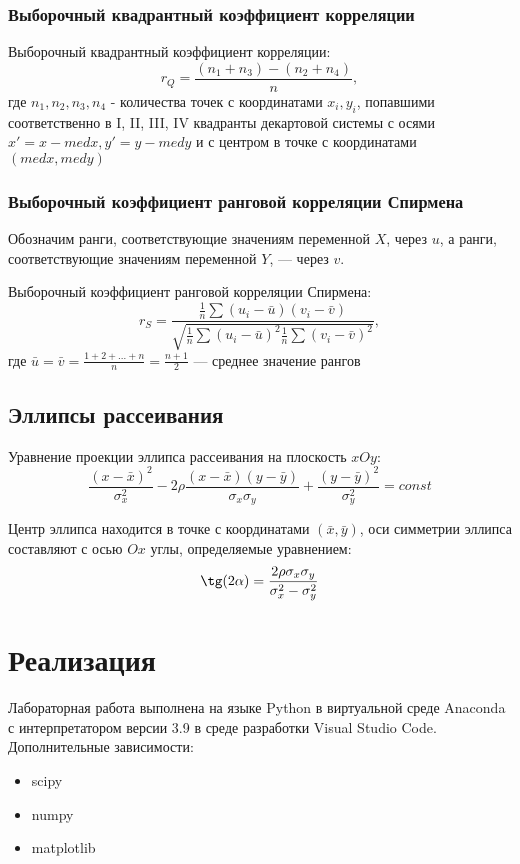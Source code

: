 \documentclass[12pt,a4paper]{article}
\begin{document}
\subsubsection{Выборочный квадрантный коэффициент корреляции}
Выборочный квадрантный коэффициент корреляции:
\begin{equation}
    r_Q=\frac{(n_1+n_3)-(n_2+n_4)}{n},
\end{equation}
где $n_1,n_2,n_3,n_4$ - количества точек с координатами $x_i,y_i$, попавшими соответственно в I, II, III, IV квадранты декартовой системы с осями $x'=x-medx,y'=y-medy$ и с центром в точке с координатами $(medx,medy)$

\subsubsection{Выборочный коэффициент ранговой корреляции Спирмена}
Обозначим ранги, соответствующие значениям переменной $X$, через $u$, а ранги, соответствующие значениям переменной $Y$, — через $v$.

Выборочный коэффициент ранговой корреляции Спирмена:
\begin{equation}
    r_S=\frac{\frac{1}{n}\sum{(u_i-\bar{u})(v_i-\bar{v})}}{\sqrt{\frac{1}{n}\sum{(u_i-\bar{u})^2}\frac{1}{n}\sum{(v_i-\bar{v})^2}}},
\end{equation}
где $\bar{u}=\bar{v}=\frac{1+2+...+n}{n}=\frac{n+1}{2}$ — среднее значение рангов

\subsection{Эллипсы рассеивания}
Уравнение проекции эллипса рассеивания на плоскость $xOy$:
\begin{equation}
    \frac{(x-\bar{x})^2}{\sigma_x^2}-2\rho\frac{(x-\bar{x})(y-\bar{y})}{\sigma_x\sigma_y}+\frac{(y-\bar{y})^2}{\sigma_y^2}=const
\end{equation}

Центр эллипса находится в точке с координатами $(\bar{x},\bar{y})$, оси симметрии эллипса составляют с осью $Ox$ углы, определяемые уравнением:
\begin{equation}
    \tg(2\alpha)=\frac{2\rho\sigma_x\sigma_y}{\sigma_x^2-\sigma_y^2}
\end{equation}

\section{Реализация}
Лабораторная работа выполнена на языке Python в виртуальной среде Anaconda с интерпретатором версии 3.9 в среде разработки Visual Studio Code. Дополнительные зависимости:
\begin{itemize}
    \item scipy
    \item numpy
    \item matplotlib
\end{itemize}
\end{document}

